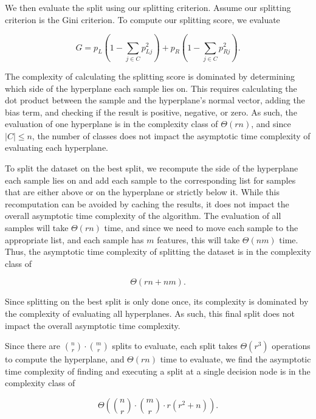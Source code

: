 \documentclass[10pt]{article} %
\begin{document}
We then evaluate the split using our splitting criterion. Assume our splitting criterion is the Gini criterion. To compute our splitting score, we evaluate

\begin{equation*}
	G = p_L \left(1 - \sum_{j\in C} p_{Lj}^2 \right) + p_R \left(1 - \sum_{j \in C} p_{Rj}^2 \right).
	\label{gini_usage}
\end{equation*}

The complexity of calculating the splitting score is dominated by determining which side of the hyperplane each sample lies on. This requires calculating the dot product between the sample and the hyperplane's normal vector, adding the bias term, and checking if the result is positive, negative, or zero. As such, the evaluation of one hyperplane is in the complexity class of \( \Theta(rn) \), and since \( |C| \leq n \), the number of classes does not impact the asymptotic time complexity of evaluating each hyperplane.

To split the dataset on the best split, we recompute the side of the hyperplane each sample lies on and add each sample to the corresponding list for samples that are either above or on the hyperplane or strictly below it. While this recomputation can be avoided by caching the results, it does not impact the overall asymptotic time complexity of the algorithm. The evaluation of all samples will take \( \Theta(rn) \) time, and since we need to move each sample to the appropriate list, and each sample has \( m \) features, this will take \( \Theta(nm) \) time. Thus, the asymptotic time complexity of splitting the dataset is in the complexity class of

\begin{equation*}
	\Theta(rn + nm).
\end{equation*}

Since splitting on the best split is only done once, its complexity is dominated by the complexity of evaluating all hyperplanes. As such, this final split does not impact the overall asymptotic time complexity.

Since there are \( \binom{n}{r} \cdot \binom{m}{r} \) splits to evaluate, each split takes \( \Theta(r^3) \) operations to compute the hyperplane, and \( \Theta(rn) \) time to evaluate, we find the asymptotic time complexity of finding and executing a split at a single decision node is in the complexity class of

\[
	\Theta\left( \binom{n}{r} \cdot \binom{m}{r} \cdot r(r^2 + n) \right).
\]
\end{document}

